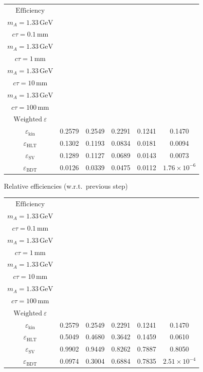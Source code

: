 \documentclass[10pt,a4paper]{article}
\begin{document}
{\begin{tabular}{cccccc}
\toprule
$\mathrm{Efficiency}$ & \shortstack{$m_{\pi}=4\,\mathrm{GeV}$\\$m_{A}=1.33\,\mathrm{GeV}$\\$c\tau=0.1\,\mathrm{mm}$} & \shortstack{$m_{\pi}=4\,\mathrm{GeV}$\\$m_{A}=1.33\,\mathrm{GeV}$\\$c\tau=1\,\mathrm{mm}$} & \shortstack{$m_{\pi}=4\,\mathrm{GeV}$\\$m_{A}=1.33\,\mathrm{GeV}$\\$c\tau=10\,\mathrm{mm}$} & \shortstack{$m_{\pi}=4\,\mathrm{GeV}$\\$m_{A}=1.33\,\mathrm{GeV}$\\$c\tau=100\,\mathrm{mm}$} & \shortstack{$\mathrm{QCD}$\\$\mathrm{Weighted}\ \varepsilon$} \\
\midrule
$\varepsilon_{\mathrm{kin}}$ & 0.2579 & 0.2549 & 0.2291 & 0.1241 & 0.1470\\
$\varepsilon_{\mathrm{HLT}}$ & 0.1302 & 0.1193 & 0.0834 & 0.0181 & 0.0094\\
$\varepsilon_{\mathrm{SV}}$ & 0.1289 & 0.1127 & 0.0689 & 0.0143 & 0.0073\\
$\varepsilon_{\mathrm{BDT}}$ & 0.0126 & 0.0339 & 0.0475 & 0.0112 & $1.76\times10^{-6}$\\
\bottomrule
\end{tabular}

\vspace{18pt}

Relative efficiencies (w.r.t.\ previous step)

\begin{tabular}{cccccc}
\toprule
$\mathrm{Efficiency}$ & \shortstack{$m_{\pi}=4\,\mathrm{GeV}$\\$m_{A}=1.33\,\mathrm{GeV}$\\$c\tau=0.1\,\mathrm{mm}$} & \shortstack{$m_{\pi}=4\,\mathrm{GeV}$\\$m_{A}=1.33\,\mathrm{GeV}$\\$c\tau=1\,\mathrm{mm}$} & \shortstack{$m_{\pi}=4\,\mathrm{GeV}$\\$m_{A}=1.33\,\mathrm{GeV}$\\$c\tau=10\,\mathrm{mm}$} & \shortstack{$m_{\pi}=4\,\mathrm{GeV}$\\$m_{A}=1.33\,\mathrm{GeV}$\\$c\tau=100\,\mathrm{mm}$} & \shortstack{$\mathrm{QCD}$\\$\mathrm{Weighted}\ \varepsilon$} \\
\midrule
$\varepsilon_{\mathrm{kin}}$ & 0.2579 & 0.2549 & 0.2291 & 0.1241 & 0.1470\\
$\varepsilon_{\mathrm{HLT}}$ & 0.5049 & 0.4680 & 0.3642 & 0.1459 & 0.0610\\
$\varepsilon_{\mathrm{SV}}$ & 0.9902 & 0.9449 & 0.8262 & 0.7887 & 0.8050\\
$\varepsilon_{\mathrm{BDT}}$ & 0.0974 & 0.3004 & 0.6884 & 0.7835 & $2.51\times10^{-4}$\\
\bottomrule
\end{tabular}

}
\end{document}
